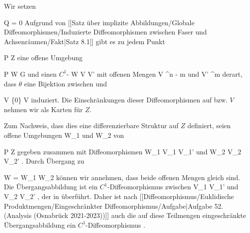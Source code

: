 {

Wir setzen

\mavergleichskette
{\vergleichskette
{ Q
}
{ = }{ 0
}
{  }{
}
{    }{
}
{   }{
}
}
{}{}{}
Aufgrund von
[[Satz über implizite Abbildungen/Globale Diffeomorphismen/Induzierte Diffeomorphismen zwischen Faser und Achsenräumen/Fakt|Satz 8.1]]
gibt es zu jedem Punkt

\mavergleichskette
{\vergleichskette
{ P
}
{ \in }{ Z
}
{  }{
}
{    }{
}
{   }{
}
}
{}{}{}
eine offene Umgebung

\mavergleichskette
{\vergleichskette
{ P
}
{ \in }{ W
}
{ \subseteq }{ G
}
{    }{
}
{   }{
}
}
{}{}{}
und einen
$C^1$-
\maabbdisp {\theta} { W } { V \times V'
} {}
mit offenen Mengen
\mathkor {} {V \subseteq \R^{n - m }} {und} {V' \subseteq \R^m} {}
derart, dass $\theta$ eine Bijektion zwischen
 und

\mavergleichskette
{\vergleichskette
{ V \times \{0\}
}
{ \cong }{ V
}
{  }{
}
{    }{
}
{   }{
}
}
{}{}{}
induziert. Die Einschränkungen dieser Diffeomorphismen auf
 bzw. $V$ nehmen wir als Karten für $Z$.
\teilbeweis {}{}{}
{Zum Nachweis, dass dies eine differenzierbare Struktur auf $Z$ definiert, seien offene Umgebungen
 {} {}
\mathkor {} {W_1} {und} {W_2} {}
von

\mavergleichskette
{\vergleichskette
{ P
}
{ \in }{ Z
}
{  }{
}
{    }{
}
{   }{
}
}
{}{}{}
gegeben zusammen mit Diffeomorphismen
 {W_1 } { V_1 \times V_1'
} {} und  {W_2 } { V_2 \times V_2'
} {.}
Durch Übergang zu

\mavergleichskette
{\vergleichskette
{ W
}
{ = }{ W_1 \cap W_2
}
{  }{
}
{    }{
}
{   }{
}
}
{}{}{}
können wir annehmen, dass beide offenen Mengen gleich sind. Die Übergangsabbildung
 ist ein $C^1$-Diffeomorphismus zwischen
 {} {}
\mathkor {} {V_1 \times V_1'} {und} {V_2 \times V_2'} {,}
der
 in
 überführt. Daher ist nach
[[Diffeomorphismus/Euklidische Produktmengen/Eingeschränkter Diffeomorphismus/Aufgabe|Aufgabe 52. (Analysis (Osnabrück 2021-2023))]]
auch die auf diese Teilmengen eingeschränkte Übergangsabbildung ein $C^1$-Diffeomorphismus
 {} {.}}
{}

}


